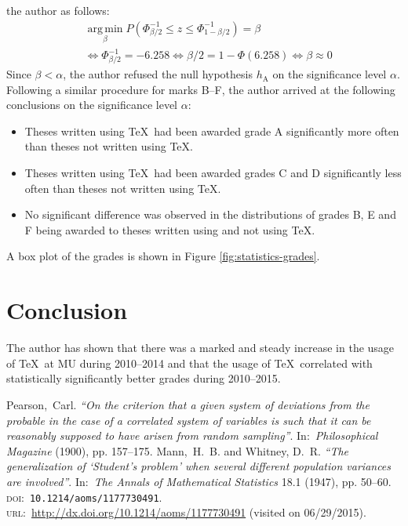 \documentclass{csbulletin}
\begin{document}
{  the author as follows:\begin{align}
    & \operatorname{arg\,min}\limits_{\beta} P(\Phi^{-1}_{\beta/2}
        \leq z\leq\Phi^{-1}_{1-\beta/2})=\beta \\
    \nonumber& \iff\Phi^{-1}_{\beta/2}=-6.258 \iff\beta/2=1-
        \Phi(6.258)\iff\beta\approx 0
  \end{align}Since $\beta<\alpha$, the author refused the null
  hypothesis $h_\text{A}$ on the significance level $\alpha$.
  Following a similar procedure for marks B--F, the author arrived
  at the following conclusions on the significance level $\alpha$:
  \begin{itemize}
    \item Theses written using \TeX\ had been awarded grade A
      significantly more often than theses not written using \TeX.
    \item Theses written using \TeX\ had been awarded grades C and
      D significantly less often than theses not written using
      \TeX.
    \item No significant difference was observed in the
      distributions of grades B, E and F being awarded to theses
      written using and not using \TeX.
  \end{itemize}
  A box plot of the grades is shown in Figure
  \ref{fig:statistics-grades}.

  \section{Conclusion}
  The author has shown that there was a marked and steady increase
  in the usage of \TeX\ at MU during 2010--2014 and that the usage
  of \TeX\ correlated with statistically significantly better
  grades during 2010--2015.

  \begin{thebibliography}{9}
          Pearson,~Carl.
          \textit{``On the criterion that a given system of deviations from the probable in the case of a correlated system of
            variables is such that it can be reasonably supposed to have arisen from random sampling''}.
          In:~\textit{Philosophical Magazine} (1900), pp. 157--175.
          Mann,~H.~B. and Whitney, D.~R.
          \textit{``The generalization of `Student's problem' when several different population variances are involved''}.
          In:~\textit{The Annals of Mathematical Statistics} 18.1 (1947), pp. 50--60.
          \textsc{doi:}~\texttt{10.1214/aoms/1177730491}.
          \textsc{url:}~\url{http://dx.doi.org/10.1214/aoms/1177730491} (visited on 06/29/2015).
  \end{thebibliography}

  \begin{summary}\theAbstract\end{summary}}
\end{document}
